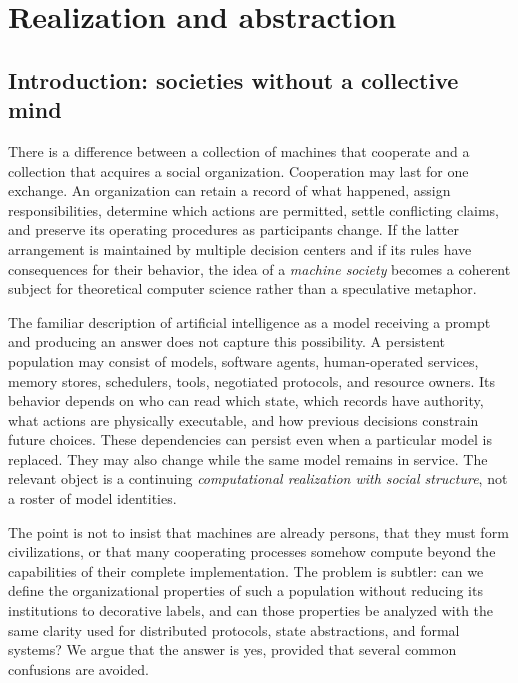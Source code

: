 
\chapter{Realization and abstraction}\label{MS:book:chapter-93}

\section{Introduction: societies without a collective mind}\label{MS:sec:introduction}

There is a difference between a collection of machines that cooperate and a collection that acquires a social organization. Cooperation may last for one exchange. An organization can retain a record of what happened, assign responsibilities, determine which actions are permitted, settle conflicting claims, and preserve its operating procedures as participants change. If the latter arrangement is maintained by multiple decision centers and if its rules have consequences for their behavior, the idea of a \emph{machine society} becomes a coherent subject for theoretical computer science rather than a speculative metaphor.

The familiar description of artificial intelligence as a model receiving a prompt and producing an answer does not capture this possibility. A persistent population may consist of models, software agents, human-operated services, memory stores, schedulers, tools, negotiated protocols, and resource owners. Its behavior depends on who can read which state, which records have authority, what actions are physically executable, and how previous decisions constrain future choices. These dependencies can persist even when a particular model is replaced. They may also change while the same model remains in service. The relevant object is a continuing \emph{computational realization with social structure}, not a roster of model identities.

The point is not to insist that machines are already persons, that they must form civilizations, or that many cooperating processes somehow compute beyond the capabilities of their complete implementation. The problem is subtler: can we define the organizational properties of such a population without reducing its institutions to decorative labels, and can those properties be analyzed with the same clarity used for distributed protocols, state abstractions, and formal systems? We argue that the answer is yes, provided that several common confusions are avoided.

